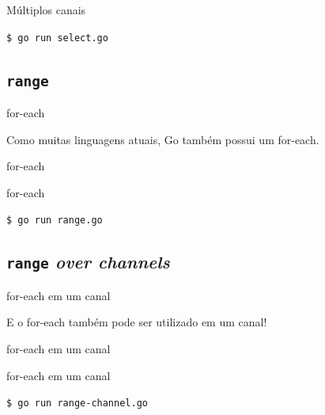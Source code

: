 \documentclass{beamer}
\begin{document}
\begin{frame}[fragile]
    {Múltiplos canais}

    \verb|$ go run select.go|
    
\end{frame}

\subsection{\tt range}
\begin{frame}
    {for-each}

    Como muitas linguagens atuais, Go também possui um for-each.
\end{frame}

\begin{frame}[fragile]
    {for-each}

    
\end{frame}

\begin{frame}[fragile]
    {for-each}

    \verb|$ go run range.go|
    
\end{frame}

\subsection{{\tt range} {\em over channels}}
\begin{frame}
    {for-each em um canal}

    E o for-each também pode ser utilizado em um canal!
\end{frame}

\begin{frame}[fragile]
    {for-each em um canal}

    
\end{frame}

\begin{frame}[fragile]
    {for-each em um canal}

    \verb|$ go run range-channel.go|
    
\end{frame}

\end{document}
